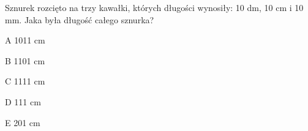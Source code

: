 \begin{tresc}
Sznurek rozcięto na trzy kawałki, których długości wynosiły: 10 dm, 10 cm i 10 mm. Jaka była długość całego sznurka?
\end{tresc}
\begin{wariant}{A} 1011 cm \end{wariant}
\begin{wariant}{B} 1101 cm \end{wariant}
\begin{wariant}{C} 1111 cm \end{wariant}
\begin{wariant}{D} 111 cm \end{wariant}
\begin{wariant}{E} 201 cm \end{wariant}
